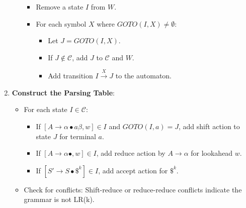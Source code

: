 \begin{enumerate}
\begin{itemize}
\begin{itemize}
     \item Remove a state $I$ from $W$.
     \item For each symbol $X$ where $GOTO(I, X) \neq \emptyset$:
       \begin{itemize}
       \item Let $J = GOTO(I, X)$.
       \item If $J \notin \mathcal{C}$, add $J$ to $\mathcal{C}$ and $W$.
       \item Add transition $I \xrightarrow{X} J$ to the automaton.
       \end{itemize}
     \end{itemize}
   \end{itemize}
\item \textbf{Construct the Parsing Table}:
   \begin{itemize}
   \item For each state $I \in \mathcal{C}$:
     \begin{itemize}
     \item If $[A \to \alpha \bullet a \beta, w] \in I$ and $GOTO(I, a) = J$, add shift action to state $J$ for terminal $a$.
     \item If $[A \to \alpha \bullet, w] \in I$, add reduce action by $A \to \alpha$ for lookahead $w$.
     \item If $[S' \to S \bullet \$^k] \in I$, add accept action for $\$^k$.
     \end{itemize}
   \item Check for conflicts: Shift-reduce or reduce-reduce conflicts indicate the grammar is not LR(k).
   \end{itemize}
\end{enumerate}
